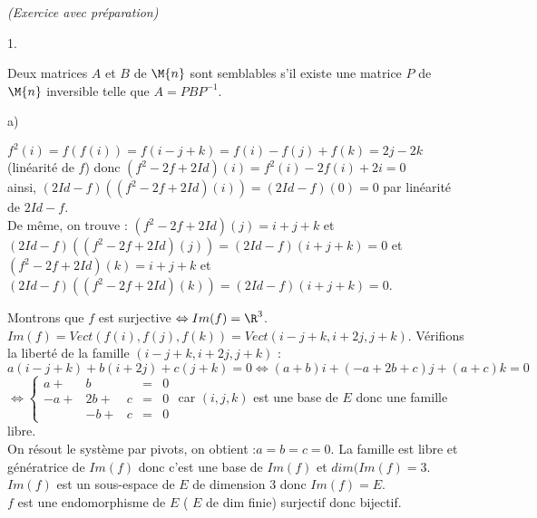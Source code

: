 \documentclass[11pt]{article}%
\begin{document}
 \begin{exercice}{\it (Exercice avec préparation)}~
 \begin{noliste}{1.}
 \setlength{\itemsep}{4mm}
 \item Deux matrices $A$ et $B$ de $\M{n}$ sont semblables s'il existe
une matrice $P$ de $\M{n}$ inversible telle que $A = PBP^{-1}$. 
 \item
 \begin{noliste}{a)}
 \setlength{\itemsep}{2mm}
 \item $f^{2}(i) = f (f(i)) = f(i-j + k) = f(i)-f(j) + f(k) = 2j-2k$
(linéarité de $f$) donc $(f^{2}-2f + 2Id)(i) = f^{2}(i)-2f(i) + 2i = 0$
\\
 ainsi, $(2Id-f)((f^{2}-2f + 2Id)(i)) = (2Id-f)(0) = 0$ par linéarité
de $2Id-f$. \\
 De même, on trouve : $(f^{2}-2f + 2Id)(j) = i + j + k$ et
$(2Id-f)((f^{2}-2f + 2Id)(j)) = (2Id-f)(i + j + k) = 0$ et $(f^{2}-2f +
2Id)(k) = i + j + k$ et $(2Id-f)((f^{2}-2f + 2Id)(k)) = (2Id-f)(i + j +
k) = 0$.
 \item Montrons que $f$ est surjective $\Leftrightarrow Im(f) =
\R^{3}$.\\
 $Im(f) = Vect(f(i), f(j), f(k)) = Vect(i-j + k, i + 2j, j + k)$.
Vérifions la liberté de la famille $(i-j + k, i + 2j, j + k)$ : \\
 $a(i-j + k) + b(i + 2j) + c(j + k) = 0 \Leftrightarrow (a + b)i + (-a
+ 2b + c)j + (a + c)k = 0$ $\Leftrightarrow \left\{
\begin{array}{ccccc}
 a + & b & & = & 0\\
-a + & 2b + & c & = & 0\\
 & -b + & c & = & 0
\end{array}
\right.$ car $(i,j,k)$ est une base de $E$ donc une famille libre.\\
 On résout le système par pivots, on obtient :$ a = b = c = 0$. La
famille est libre et génératrice de $Im(f)$ donc c'est une base de
$Im(f)$ et $dim(Im(f) = 3$.\\
 $Im(f)$ est un sous-espace de $E$ de dimension 3 donc $Im(f) = E$.\\
 $f$ est une endomorphisme de $E$ ( $E$ de dim finie) surjectif donc
bijectif.
 



\end{noliste}
\end{noliste}
\end{exercice}
\end{document}
